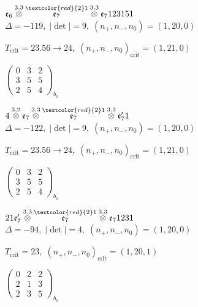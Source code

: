 \documentclass[10pt]{article}
\begin{document}
$\mathfrak{e}_6\overset{3,3}{\otimes}\overset{\textcolor{red}{2}1}{\mathfrak{e}_7}\overset{3,3}{\otimes}\mathfrak{e}_7123151$ \quad $\Delta=-119,\; |\det|=9,\; (n_+,n_-,n_0)=(1,20,0)$

\hspace{1em}$T_{\text{crit}}=23.56 \to 24,\; (n_+,n_-,n_0)_{\text{crit}}=(1,21,0)$

\hspace{2em}$\left(\begin{smallmatrix}0 & 3 & 2 \\ 3 & 5 & 5 \\ 2 & 5 & 4\end{smallmatrix}\right)_{\!b_0}$

\smallskip

$4\overset{3,2}{\otimes}\mathfrak{e}_7\overset{3,3}{\otimes}\overset{\textcolor{red}{2}1}{\mathfrak{e}_7}\overset{3,3}{\otimes}\mathfrak{e}_7'1$ \quad $\Delta=-122,\; |\det|=9,\; (n_+,n_-,n_0)=(1,20,0)$

\hspace{1em}$T_{\text{crit}}=23.56 \to 24,\; (n_+,n_-,n_0)_{\text{crit}}=(1,21,0)$

\hspace{2em}$\left(\begin{smallmatrix}0 & 3 & 2 \\ 3 & 5 & 5 \\ 2 & 5 & 4\end{smallmatrix}\right)_{\!b_0}$

\smallskip

$21\mathfrak{e}_7'\overset{3,3}{\otimes}\overset{\textcolor{red}{2}1}{\mathfrak{e}_7}\overset{3,3}{\otimes}\mathfrak{e}_71231$ \quad $\Delta=-94,\; |\det|=4,\; (n_+,n_-,n_0)=(1,20,0)$

\hspace{1em}$T_{\text{crit}}=23,\; (n_+,n_-,n_0)_{\text{crit}}=(1,20,1)$

\hspace{2em}$\left(\begin{smallmatrix}0 & 2 & 2 \\ 2 & 1 & 3 \\ 2 & 3 & 5\end{smallmatrix}\right)_{\!b_0}$
\end{document}
